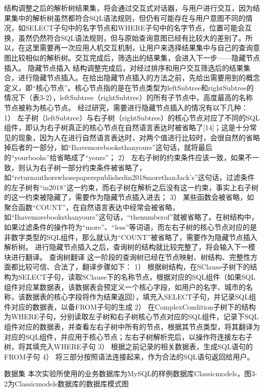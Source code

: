 结构调整之后的解析树结果集，将会通过交互式对话器，与用户进行交互，因为结果集中的解析树虽然都符合SQL语法规则，但仍有可能存在与用户意图不同的情况，如SELECT子句中的名字节点和WHERE子句中的名字节点，位置可能会互换，虽然仍然符合SQL语法规则，但与原始查询意图已经有比较大的差别了。所以，在这里需要再一次应用人机交互机制，让用户来选择结果集中与自己的查询意图比较相似的解析树。交互完成后，筛选出的结果集，会进入下一步——隐藏节点插入。
隐藏节点插入
结构调整完成后，对经过排序和用户交互筛选后的结果集合，进行隐藏节点插入。在给出隐藏节点插入的方法之前，先给出需要用到的概念定义，即“核心节点”。核心节点指的是在节点类型为leftSubtree和rightSubtree的情况下（表3-2），leftSubtree（rightSubtree）的所有子节点中，高度最高的名称节点被称为核心节点。
经过研究，需要进行隐藏节点插入的情况有以下几种：
1）	左子树（leftSubtree）与右子树（rightSubtree）的核心节点对应了不同的SQL组件，即认为右子树真正的核心节点在自然语言表达时被省略了[14]；这是十分常见的现象，因为人在进行自然语言表达时，对两个值进行比较时，会很自然的省略掉后者的一部分，如“Ihavemorebooksthanyours”这句话，就将最后的“yourbooks”给省略成了“yours”；
2）	左右子树的约束条件应该一致，如果不一致，则认为右子树一部分约束条件被省略了，如“returnauthorswhosepaperspublishedin2018morethanJack’s”这句话，过滤条件的左子树有“in2018”这一约束，而右子树在解析之后没有这一约束，事实上右子树的这一约束被隐藏了，需要作为隐藏节点插入进去；
3）	某些函数会被省略，如聚合函数“COUNT”，在自然语言表达中经常会被省略，如“Ihavemorebooksthanyours”这句话，“thenumberof”就被省略了。在树结构中，如果过滤条件的操作符为“more”、“less”等词语，而左右子树的核心节点对应的是非数字类型的SQL组件，那么就认为“COUNT”被省略了，需要作为隐藏节点插入解析树。
进行隐藏节点插入之后，查询树的结构就比较完整了，将会输入下一模块进行翻译。
查询树翻译
这一阶段的查询树已经在节点映射、树结构、完整性方面都比较可信、合法了，翻译步骤如下：
1）	根据树结构，在SClause子树下的结构为SELECT子句，读取SClause下的名称节点，根据对应的SQL组件（如果SQL组件对应某数据表，该数据表会预定义一个核心字段，如用户的名字、城市的名称，该数据表的核心字段将作为结果返回），填充入SELECT子句，并记录SQL组件对应的数据表，以备FROM子句的生成
2）	在ComplexCondition子树下的结构为WHERE子句，分别读取左子树和右子树核心节点对应的SQL组件，记录下SQL组件对应的数据表，并查看左右子树中所有的节点，根据其节点类型，将其翻译为对应的SQL组件，并应用于核心节点；左右子树解析完后，以操作符连接左右子树，将其填充入WHERE子句
3）	根据之前记录的相关数据表，生成SQL语句的FROM子句
4）	将三部分按照语法连接起来，作为合法的SQL语句返回给用户。

数据集
本次实验所使用的业务数据库为MySQL的样例数据库Classicmodels，图3-2为Classicmodels数据库的数据库模式图

